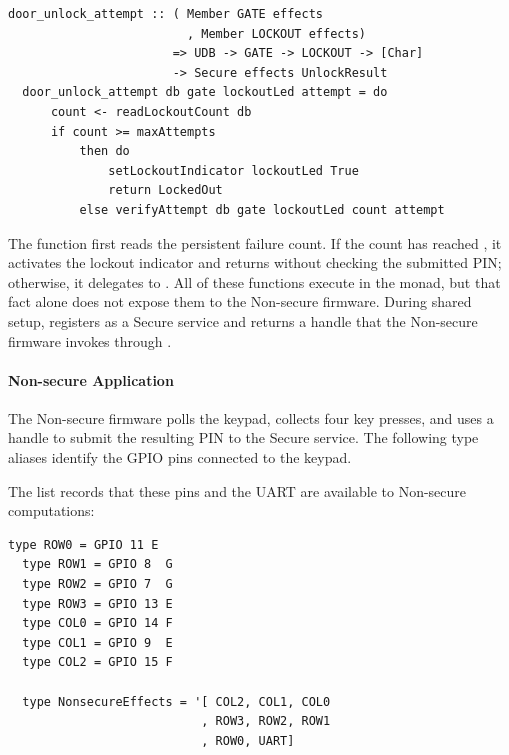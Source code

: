 \documentclass[sigconf]{acmart}
\begin{document}
\begin{lstlisting}[style=haskell]
  door_unlock_attempt :: ( Member GATE effects
                         , Member LOCKOUT effects)
                       => UDB -> GATE -> LOCKOUT -> [Char]
                       -> Secure effects UnlockResult
  door_unlock_attempt db gate lockoutLed attempt = do
      count <- readLockoutCount db
      if count >= maxAttempts
          then do
              setLockoutIndicator lockoutLed True
              return LockedOut
          else verifyAttempt db gate lockoutLed count attempt
\end{lstlisting}

The  function first reads the persistent failure count.
If the count has reached , it activates the lockout indicator and returns  without checking the submitted PIN; otherwise, it delegates to .
All of these functions execute in the  monad, but that fact alone does not expose them to the Non-secure firmware.
During shared setup,  registers  as a Secure service and returns a  handle that the Non-secure firmware invokes through .

\paragraph{Non-secure Application}

The Non-secure firmware polls the keypad, collects four key presses, and uses a  handle to submit the resulting PIN to the Secure service.
The following type aliases identify the GPIO pins connected to the keypad.

The  list records that these pins and the UART are available to Non-secure computations:

\begin{lstlisting}[style=haskell]
  type ROW0 = GPIO 11 E
  type ROW1 = GPIO 8  G
  type ROW2 = GPIO 7  G
  type ROW3 = GPIO 13 E
  type COL0 = GPIO 14 F
  type COL1 = GPIO 9  E
  type COL2 = GPIO 15 F

  type NonsecureEffects = '[ COL2, COL1, COL0
                           , ROW3, ROW2, ROW1
                           , ROW0, UART]
\end{lstlisting}
\end{document}
